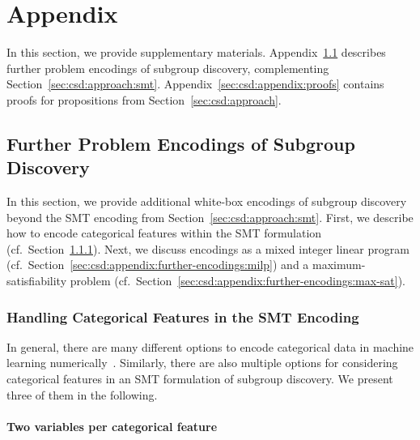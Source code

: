 \documentclass{article}
\theoremstyle{definition}
\begin{document}

\appendix

\section{Appendix}
\label{sec:csd:appendix}

In this section, we provide supplementary materials.
Appendix~\ref{sec:csd:appendix:further-encodings} describes further problem encodings of subgroup discovery, complementing Section~\ref{sec:csd:approach:smt}.
Appendix~\ref{sec:csd:appendix:proofs} contains proofs for propositions from Section~\ref{sec:csd:approach}.

\subsection{Further Problem Encodings of Subgroup Discovery}
\label{sec:csd:appendix:further-encodings}

In this section, we provide additional white-box encodings of subgroup discovery beyond the SMT encoding from Section~\ref{sec:csd:approach:smt}.
First, we describe how to encode categorical features within the SMT formulation (cf.~Section~\ref{sec:csd:appendix:further-encodings:smt-categorical}).
Next, we discuss encodings as a mixed integer linear program (cf.~Section~\ref{sec:csd:appendix:further-encodings:milp}) and a maximum-satisfiability problem (cf.~Section~\ref{sec:csd:appendix:further-encodings:max-sat}).

\subsubsection{Handling Categorical Features in the SMT Encoding}
\label{sec:csd:appendix:further-encodings:smt-categorical}

In general, there are many different options to encode categorical data in machine learning numerically~\cite{matteucci2023benchmark}.
Similarly, there are also multiple options for considering categorical features in an SMT formulation of subgroup discovery.
We present three of them in the following.

\paragraph{Two variables per categorical feature}
\end{document}
